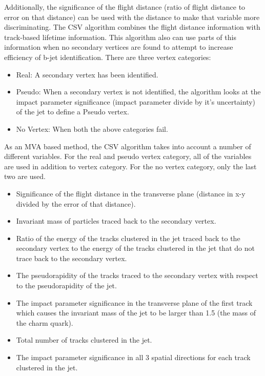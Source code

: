 	Additionally, the significance of the flight distance (ratio of flight distance to error on that distance) can be used with the distance to make that variable more discriminating. The CSV algorithm combines the flight distance information with track-based lifetime information. This algorithm also can use parts of this information when no secondary vertices are found to attempt to increase efficiency of b-jet identification. There are three vertex categories:
	\begin{itemize}
	\item Real: A secondary vertex has been identified.\\
	\item Pseudo: When a secondary vertex is not identified, the algorithm looks at the impact parameter significance (impact parameter divide by it's uncertainty) of the jet to define a Pseudo vertex.\\
	\item No Vertex: When both the above categories fail.\\
	\end{itemize}
	
	As an MVA based method, the CSV algorithm takes into account a number of different variables. For the real and pseudo vertex category, all of the variables are used in addition to vertex category. For the no vertex category, only the last two are used.
	\begin{itemize}
	\item Significance of the flight distance in the transverse plane (distance in x-y divided by the error of that distance).\\
	\item Invariant mass of particles traced back to the secondary vertex.\\
	\item Ratio of the energy of the tracks clustered in the jet traced back to the secondary vertex to the energy of the tracks clustered in the jet that do not trace back to the secondary vertex.\\
	\item The pseudorapidity of the tracks traced to the secondary vertex with respect to the pseudorapidity of the jet.\\
	\item The impact parameter significance in the transverse plane of the first track which causes the invariant mass of the jet to be larger than 1.5 \GeVcc (the mass of the charm quark).\\
	\item Total number of tracks clustered in the jet.\\
	\item The impact parameter significance in all 3 spatial directions for each track clustered in the jet.\\
	\end{itemize}
	
